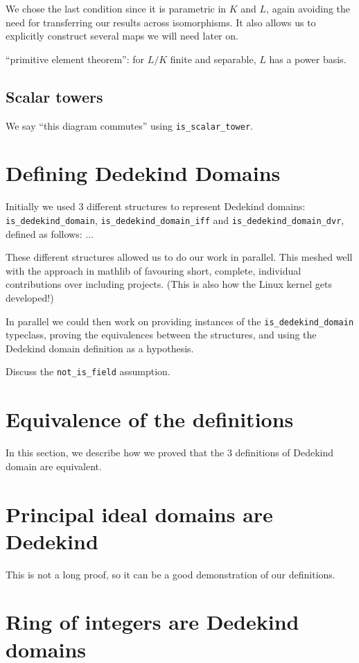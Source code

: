 \documentclass{lipics-v2021}
\newcommand{\lean}[1]{\texttt{#1}\xspace} %
\begin{document}
We chose the last condition since it is parametric in $K$ and $L$, again avoiding the need for transferring our results across isomorphisms. It also allows us to explicitly construct several maps we will need later on.

``primitive element theorem'': for $L / K$ finite and separable, $L$ has a power basis.

\subsection{Scalar towers}

We say ``this diagram commutes'' using \lean{is\_scalar\_tower}.

\section{Defining Dedekind Domains}

Initially we used 3 different structures to represent Dedekind domains: \lean{is\_dedekind\_domain}, \lean{is\_dedekind\_domain\_iff} and \lean{is\_dedekind\_domain\_dvr}, defined as follows:
...

These different structures allowed us to do our work in parallel. This meshed well with the approach in mathlib of favouring short, complete, individual contributions over including projects. (This is also how the Linux kernel gets developed!)

In parallel we could then work on providing instances of the \lean{is\_dedekind\_domain} typeclass, proving the equivalences between the structures, and using the Dedekind domain definition as a hypothesis.

Discuss the \lean{not\_is\_field} assumption.

\section{Equivalence of the definitions}

In this section, we describe how we proved that the 3 definitions of Dedekind domain are equivalent.

\section{Principal ideal domains are Dedekind}

This is not a long proof, so it can be a good demonstration of our definitions.

\section{Ring of integers are Dedekind domains}
\end{document}
